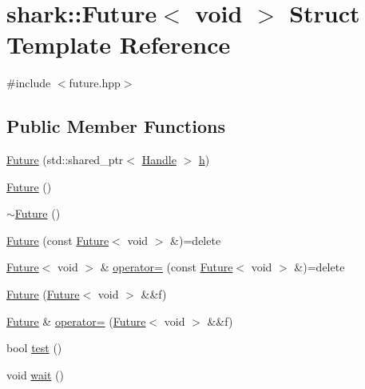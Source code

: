 \hypertarget{structshark_1_1_future_3_01void_01_4}{}\section{shark\+:\+:Future$<$ void $>$ Struct Template Reference}
\label{structshark_1_1_future_3_01void_01_4}


{\ttfamily \#include $<$future.\+hpp$>$}

\subsection*{Public Member Functions}
\begin{DoxyCompactItemize}
\item 
\hyperlink{structshark_1_1_future_3_01void_01_4_a3c0708ce00cad84931544af6c7f415d1}{Future} (std\+::shared\+\_\+ptr$<$ \hyperlink{classshark_1_1_handle}{Handle} $>$ \hyperlink{structshark_1_1_future_3_01void_01_4_a6cd84878a921af7b50e18accd766677e}{h})
\item 
\hyperlink{structshark_1_1_future_3_01void_01_4_a9d9ba1fd13888e20745b8db129ae59e3}{Future} ()
\item 
\hyperlink{structshark_1_1_future_3_01void_01_4_a07e736f76c27ca4ee5c8f7ce09d9f7a4}{$\sim$\+Future} ()
\item 
\hyperlink{structshark_1_1_future_3_01void_01_4_ab1d9ff8c5185ea0b9c1d738a1e17154c}{Future} (const \hyperlink{structshark_1_1_future}{Future}$<$ void $>$ \&)=delete
\item 
\hyperlink{structshark_1_1_future}{Future}$<$ void $>$ \& \hyperlink{structshark_1_1_future_3_01void_01_4_a6c0e75cc374582c7454cff341b559915}{operator=} (const \hyperlink{structshark_1_1_future}{Future}$<$ void $>$ \&)=delete
\item 
\hyperlink{structshark_1_1_future_3_01void_01_4_a3ad618247c8f98b53ee259e65c99fe7a}{Future} (\hyperlink{structshark_1_1_future}{Future}$<$ void $>$ \&\&f)
\item 
\hyperlink{structshark_1_1_future}{Future} \& \hyperlink{structshark_1_1_future_3_01void_01_4_aee3b7c5d2cf7c7b6d0a0f34fc1da225f}{operator=} (\hyperlink{structshark_1_1_future}{Future}$<$ void $>$ \&\&f)
\item 
bool \hyperlink{structshark_1_1_future_3_01void_01_4_aaed8863f8051fdc001bdf2ffb83d6ccf}{test} ()
\item 
void \hyperlink{structshark_1_1_future_3_01void_01_4_ab44321f72b9e3c40b622d612a772156c}{wait} ()
\end{DoxyCompactItemize}
